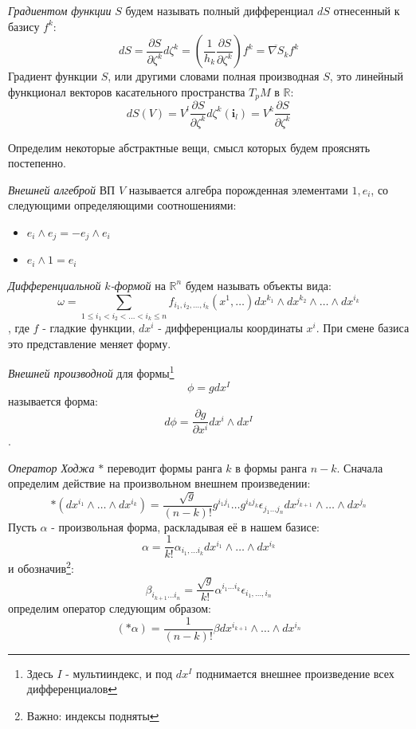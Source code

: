 \documentclass{article}
\begin{document}
\textit{Градиентом функции} $S$ будем называть полный дифференциал $dS$ отнесенный к базису $f^k$:
$$dS = \frac{\partial S}{\partial \zeta^k} d \zeta^k= (\frac{1}{h_k} \frac{\partial S}{\partial \zeta^k}) f^k = \overline{\nabla S}_k f^k$$
Градиент функции $S$, или другими словами полная производная $S$, это линейный функционал векторов касательного пространства $T_p M$ в $\mathbb{R}$:
$$dS(V) = V^l \frac{\partial S}{\partial \zeta^k} d \zeta^k (\mathbf{i}_l) = V^k \frac{\partial S}{\partial \zeta^k}$$

Определим некоторые абстрактные вещи, смысл которых будем прояснять постепенно.

\textit{Внешней алгеброй} ВП $V$ называется алгебра порожденная элементами $1, e_i$, со следующими определяющими соотношениями:
\begin{itemize}
    \item$ e_i \wedge e_j = - e_j \wedge e_i$
    \item $e_i \wedge 1 = e_i$
\end{itemize}

 \textit{Дифференциальной} $k$\textit{-формой} на $\mathbb{R}^n$ будем  называть объекты вида:
$$\omega = \sum_{1\leq i_1 < i_2 <\dots < i_k \leq n} f_{i_1, i_2, \dots, i_k} (x^1, \dots) dx^{k_1} \wedge dx^{k_2} \wedge \dots \wedge d x^{i_k}$$, 
где $f$ - гладкие функции, $dx^i$ - дифференциалы координаты $x^i$. При смене базиса это представление меняет форму.

\textit{Внешней производной} для формы\footnote{Здесь $I$ - мультииндекс, и под $dx^I$ поднимается внешнее произведение всех дифференциалов}
$$\phi = g dx^I $$
называется форма:
$$ d\phi = \frac{\partial g}{\partial x^i} dx^i \wedge dx^I$$.



\textit{Оператор Ходжа} $*$ переводит формы ранга $k$ в формы ранга $n-k$.
Сначала определим действие на произвольном внешнем произведении:
$$* (dx^{i_1} \wedge \dots \wedge d x^{i_k}) = \frac{\sqrt{g}}{(n-k)!} g^{i_1 j_1} \dots g^{i_k j_k} \epsilon_{j_1 \dots j_n} dx^{j_{k+1}} \wedge \dots \wedge dx ^ {j_n}$$
Пусть $\alpha$ - произвольная форма, раскладывая её в нашем базисе:
$$ \alpha = \frac{1}{k!} \alpha_{i_1, \dots i_k} dx^{i_1} \wedge \dots \wedge dx^{i_k}$$
и обозначив\footnote{Важно: индексы подняты}:
$$ \beta_{i_{k+1} \dots i_n}= \frac{\sqrt{g}}{k!} \alpha^{i_1\dots i_k} \epsilon_{i_1,\dots, i_n}$$
определим оператор следующим образом:
$$(*\alpha) = \frac{1}{(n-k)!} \beta dx^{i_{k+1}} \wedge \dots \wedge dx^{i_n}$$
\end{document}
